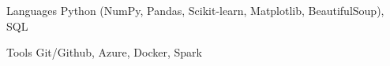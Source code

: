 \begin{cvskills}
  \cvskill
    {Languages}
    {Python (NumPy, Pandas, Scikit-learn, Matplotlib, BeautifulSoup), SQL} %

  \cvskill
    {Tools} %
    {Git/Github, Azure, Docker, Spark} %
\end{cvskills}
